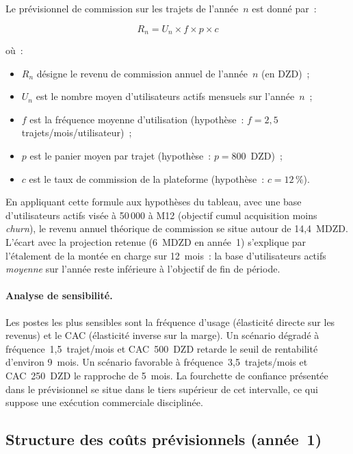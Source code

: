 Le prévisionnel de commission sur les trajets de l'année~$n$ est donné par~:

\begin{equation}
  R_n = U_n \times f \times p \times c
  \label{eq:revenus}
\end{equation}

\noindent où~:
\begin{itemize}[leftmargin=2cm, label={}]
  \item $R_n$ désigne le revenu de commission annuel de l'année~$n$ (en DZD)~;
  \item $U_n$ est le nombre moyen d'utilisateurs actifs mensuels sur l'année~$n$~;
  \item $f$ est la fréquence moyenne d'utilisation (hypothèse~: $f = 2{,}5$ trajets/mois/utilisateur)~;
  \item $p$ est le panier moyen par trajet (hypothèse~: $p = 800$~DZD)~;
  \item $c$ est le taux de commission de la plateforme (hypothèse~: $c = 12\,\%$).
\end{itemize}

En appliquant cette formule aux hypothèses du tableau, avec une base d'utilisateurs actifs visée à 50\,000 à M12 (objectif cumul acquisition moins \textit{churn}), le revenu annuel théorique de commission se situe autour de 14,4~MDZD. L'écart avec la projection retenue (6~MDZD en année~1) s'explique par l'étalement de la montée en charge sur 12~mois~: la base d'utilisateurs actifs \textit{moyenne} sur l'année reste inférieure à l'objectif de fin de période.

\paragraph{Analyse de sensibilité.} Les postes les plus sensibles sont la fréquence d'usage (élasticité directe sur les revenus) et le CAC (élasticité inverse sur la marge). Un scénario dégradé à fréquence~1,5~trajet/mois et CAC~500~DZD retarde le seuil de rentabilité d'environ 9~mois. Un scénario favorable à fréquence~3,5~trajets/mois et CAC~250~DZD le rapproche de 5~mois. La fourchette de confiance présentée dans le prévisionnel se situe dans le tiers supérieur de cet intervalle, ce qui suppose une exécution commerciale disciplinée.

\subsection{Structure des coûts prévisionnels (année~1)}

